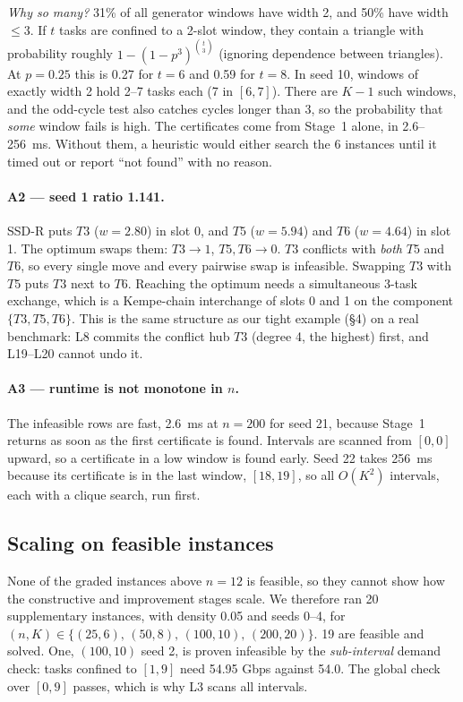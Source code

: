 \emph{Why so many?} 31\% of all generator windows have width 2, and 50\%
have width $\le 3$. If $t$ tasks are confined to a 2-slot window, they
contain a triangle with probability roughly $1-(1-p^3)^{\binom{t}{3}}$
(ignoring dependence between triangles). At $p=0.25$ this is 0.27 for
$t=6$ and 0.59 for $t=8$. In seed 10, windows of exactly width 2 hold 2--7
tasks each (7 in $[6,7]$). There are $K-1$ such windows, and the odd-cycle
test also catches cycles longer than 3, so the probability that
\emph{some} window fails is high. The certificates come from
Stage~1 alone, in 2.6--256~ms. Without them, a heuristic would either
search the 6 instances until it timed out or report ``not found'' with no
reason.

\paragraph{A2 --- seed 1 ratio 1.141.}
SSD-R puts $T3$ ($w{=}2.80$) in slot 0, and $T5$ ($w{=}5.94$) and $T6$
($w{=}4.64$) in slot 1. The optimum swaps them: $T3\to1$, $T5,T6\to0$.
$T3$ conflicts with \emph{both} $T5$ and $T6$, so every single move and
every pairwise swap is infeasible. Swapping $T3$ with $T5$ puts $T3$ next
to $T6$. Reaching the optimum needs a simultaneous 3-task exchange, which
is a Kempe-chain interchange of slots 0 and 1 on the component
$\{T3,T5,T6\}$. This is the same structure as our tight example (\S4) on a
real benchmark: L8 commits the conflict hub $T3$ (degree 4, the highest)
first, and L19--L20 cannot undo it.

\paragraph{A3 --- runtime is not monotone in $n$.}
The infeasible rows are fast, 2.6~ms at $n{=}200$ for seed 21, because
Stage~1 returns as soon as the first certificate is found. Intervals are
scanned from $[0,0]$ upward, so a certificate in a low window is found
early. Seed 22 takes 256~ms because its certificate is in the last window,
$[18,19]$, so all $O(K^2)$ intervals, each with a clique search, run first.

\subsection{Scaling on feasible instances}
None of the graded instances above $n{=}12$ is feasible, so they cannot
show how the constructive and improvement stages scale. We therefore ran
20 supplementary instances, with density 0.05 and seeds 0--4, for
$(n,K)\in\{(25,6),\,(50,8),\,(100,10),\,(200,20)\}$. 19 are feasible and solved. One, $(100,10)$ seed 2,
is proven infeasible by the \emph{sub-interval} demand check: tasks confined
to $[1,9]$ need 54.95 Gbps against 54.0. The global check over $[0,9]$
passes, which is why L3 scans all intervals.

